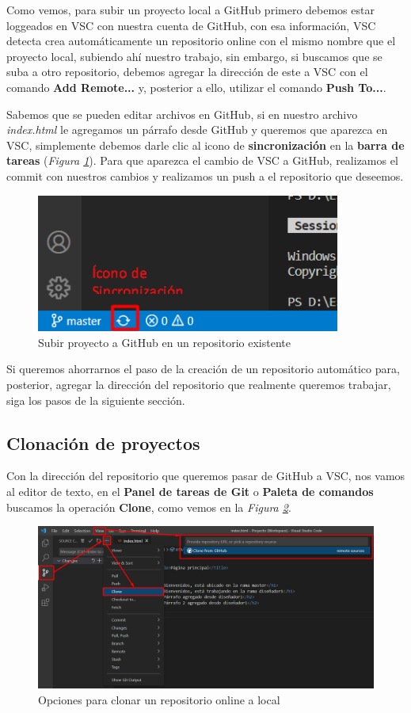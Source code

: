 Como vemos, para subir un proyecto local a GitHub primero debemos estar loggeados en VSC con nuestra cuenta de GitHub, con esa información, VSC detecta crea automáticamente un repositorio online con el mismo nombre que el proyecto local, subiendo ahí nuestro trabajo, sin embargo, si buscamos que se suba a otro repositorio, debemos agregar la dirección de este a VSC con el comando \textbf{Add Remote...} y, posterior a ello, utilizar el comando \textbf{Push To...}.

Sabemos que se pueden editar archivos en GitHub, si en nuestro archivo \textit{index.html} le agregamos un párrafo desde GitHub y queremos que aparezca en VSC, simplemente debemos darle clic al icono de \textbf{sincronización} en la \textbf{barra de tareas} (\textit{Figura \ref{fig: 32}}). Para que aparezca el cambio de VSC a GitHub, realizamos el commit con nuestros cambios y realizamos un push a el repositorio que deseemos.
\begin{figure}[H]
    \centering
    \caption{Subir proyecto a GitHub en un repositorio existente}
    \label{fig: 32}
    \includegraphics[width=10cm]{capturas/sincronizacion.png}
\end{figure}

Si queremos ahorrarnos el paso de la creación de un repositorio automático para, posterior, agregar la dirección del repositorio que realmente queremos trabajar, siga los pasos de la siguiente sección.


\subsection{Clonación de proyectos}
\hspace{0.55cm}Con la dirección del repositorio que queremos pasar de GitHub a VSC, nos vamos al editor de texto, en el \textbf{Panel de tareas de Git} o \textbf{Paleta de comandos} buscamos la operación \textbf{Clone}, como vemos en la \textit{Figura \ref{fig: 33}}.
\begin{figure}[H]
    \centering
    \caption{Opciones para clonar un repositorio online a local}
    \label{fig: 33}
    \includegraphics[width=13cm]{capturas/clone.png}
\end{figure}

